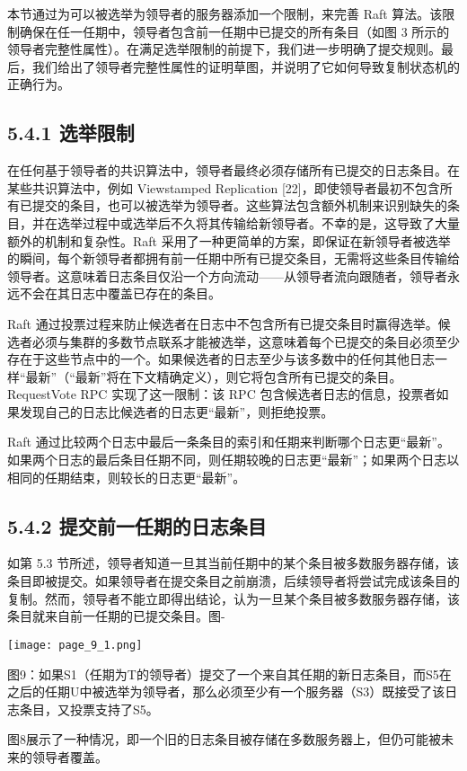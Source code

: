 \documentclass[12pt,a4paper]{report} %
\begin{document}
本节通过为可以被选举为领导者的服务器添加一个限制，来完善 Raft 算法。该限制确保在任一任期中，领导者包含前一任期中已提交的所有条目（如图 3 所示的领导者完整性属性）。在满足选举限制的前提下，我们进一步明确了提交规则。最后，我们给出了领导者完整性属性的证明草图，并说明了它如何导致复制状态机的正确行为。

\subsection*{5.4.1 选举限制}

在任何基于领导者的共识算法中，领导者最终必须存储所有已提交的日志条目。在某些共识算法中，例如 Viewstamped Replication [22]，即使领导者最初不包含所有已提交的条目，也可以被选举为领导者。这些算法包含额外机制来识别缺失的条目，并在选举过程中或选举后不久将其传输给新领导者。不幸的是，这导致了大量额外的机制和复杂性。Raft 采用了一种更简单的方案，即保证在新领导者被选举的瞬间，每个新领导者都拥有前一任期中所有已提交条目，无需将这些条目传输给领导者。这意味着日志条目仅沿一个方向流动——从领导者流向跟随者，领导者永远不会在其日志中覆盖已存在的条目。

Raft 通过投票过程来防止候选者在日志中不包含所有已提交条目时赢得选举。候选者必须与集群的多数节点联系才能被选举，这意味着每个已提交的条目必须至少存在于这些节点中的一个。如果候选者的日志至少与该多数中的任何其他日志一样“最新”（“最新”将在下文精确定义），则它将包含所有已提交的条目。RequestVote RPC 实现了这一限制：该 RPC 包含候选者日志的信息，投票者如果发现自己的日志比候选者的日志更“最新”，则拒绝投票。

Raft 通过比较两个日志中最后一条条目的索引和任期来判断哪个日志更“最新”。如果两个日志的最后条目任期不同，则任期较晚的日志更“最新”；如果两个日志以相同的任期结束，则较长的日志更“最新”。

\subsection*{5.4.2 提交前一任期的日志条目}

如第 5.3 节所述，领导者知道一旦其当前任期中的某个条目被多数服务器存储，该条目即被提交。如果领导者在提交条目之前崩溃，后续领导者将尝试完成该条目的复制。然而，领导者不能立即得出结论，认为一旦某个条目被多数服务器存储，该条目就来自前一任期的已提交条目。图-
\begin{center}
\texttt{[image: page\_9\_1.png]}
\end{center}
\begin{center} 图9：如果S1（任期为T的领导者）提交了一个来自其任期的新日志条目，而S5在之后的任期U中被选举为领导者，那么必须至少有一个服务器（S3）既接受了该日志条目，又投票支持了S5。

\end{center} 图8展示了一种情况，即一个旧的日志条目被存储在多数服务器上，但仍可能被未来的领导者覆盖。
\end{document}
